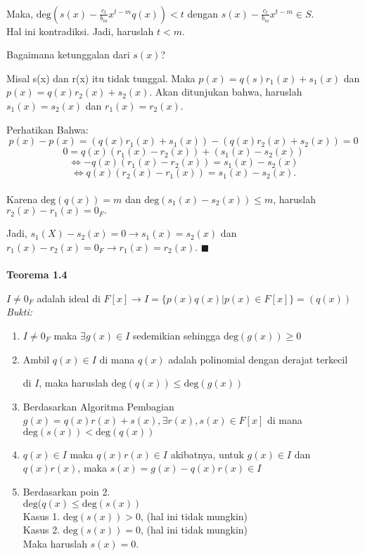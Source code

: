 \\ Maka, $\mathrm{deg}(s(x)-\frac {c_t}{b_m}x^{t-m}q(x)) < t$ dengan $s(x)-\frac {c_t}{b_m}x^{t-m} \in S$. 
\\ Hal ini kontradiksi. Jadi, haruslah $t<m$.
\\
\par Bagaimana ketunggalan dari $s(x)$?
\par Misal s(x) dan r(x) itu tidak tunggal. Maka $p(x)=q(s)r_1(x)+s_1(x)$ dan $p(x)=q(x)r_2(x)+s_2(x)$. Akan ditunjukan bahwa, haruslah $s_1(x)=s_2(x)$ dan $r_1(x)=r_2(x)$.
\par Perhatikan Bahwa:
$$p(x)-p(x)=(q(x)r_1(x)+s_1(x))-(q(x)r_2(x)+s_2(x))=0$$
$$0=q(x)(r_1(x)-r_2(x))+(s_1(x)-s_2(x))$$
$$\iff -q(x)(r_1(x)-r_2(x))=s_1(x)-s_2(x)$$
$$\iff q(x)(r_2(x)-r_1(x))=s_1(x)-s_2(x).$$
\\ Karena $\mathrm{deg}(q(x))=m$ dan $\mathrm{deg}(s_1(x)-s_2(x)) \le m$, haruslah \\$r_2(x)-r_1(x)=0_F.$
\par Jadi, $s_1(X)-s_2(x)=0 \to s_1(x)=s_2(x)$ dan $r_1(x)-r_2(x)=0_F \to r_1(x)=r_2(x).$ $\blacksquare$ 
\\ \\
\textbf{Teorema 1.4}
\par $I \ne 0_F$ adalah ideal di $F[x] \to I=\{p(x)q(x)|p(x) \in F[x]\}=(q(x))$
\\
 \textit{Bukti:}
\begin{enumerate}
\item $I \ne 0_F$ maka $\exists g(x) \in I$ sedemikian sehingga $\mathrm{deg}(g(x)) \ge 0$
\item Ambil $q(x) \in I$ di mana $q(x)$ adalah polinomial dengan derajat terkecil \par di $I$, maka haruslah $\mathrm{deg}(q(x)) \le \mathrm{deg}(g(x))$
\item Berdasarkan Algoritma Pembagian
\\ $g(x)=q(x)r(x)+s(x), \exists r(x),s(x) \in F[x]$ di mana $\mathrm{deg}(s(x))<\mathrm{deg}(q(x))$
\item $q(x) \in I$ maka $q(x)r(x) \in I$ akibatnya, untuk $g(x) \in I$ dan $q(x)r(x)$, maka $s(x)=g(x)-q(x)r(x) \in I$
\item Berdasarkan poin 2.
\\ $\mathrm{deg}(q(x) \le \mathrm{deg}(s(x))$
\\ Kasus 1. $\mathrm{deg}(s(x))>0$, (hal ini tidak mungkin)
\\ Kasus 2. $\mathrm{deg}(s(x))=0$, (hal ini tidak mungkin)
\\ Maka haruslah $s(x)=0.$
\end{enumerate}

